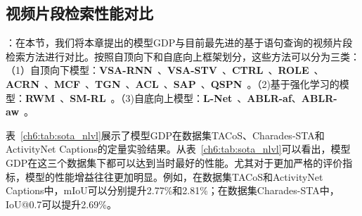 \begin{table}[tbp]
    \centering
    \caption{不同基于视频查询的视频片段检索方法的性能对比}
    \label{ch6:tab:sota_vrl}
\end{table}


\subsection{视频片段检索性能对比}

\textbf{}：在本节，我们将本章提出的模型GDP与目前最先进的基于语句查询的视频片段检索方法进行对比。按照自顶向下和自底向上框架划分，这些方法可以分为三类：（1）自顶向下模型：\textbf{VSA-RNN}~\cite{gao2017tall}、\textbf{VSA-STV}~\cite{gao2017tall}、\textbf{CTRL}~\cite{gao2017tall}、\textbf{ROLE}~\cite{liu2018cross}、\textbf{ACRN}~\cite{liu2018attentive}、\textbf{MCF}~\cite{wu2018multi}、\textbf{TGN}~\cite{chen2018temporally}、\textbf{ACL}~\cite{ge2019mac}、\textbf{SAP}~\cite{chen2019semantic}、\textbf{QSPN}~\cite{xu2019multilevel}。（2)基于强化学习的模型：\textbf{RWM}~\cite{he2019read}、\textbf{SM-RL}~\cite{wang2019language}。（3)自底向上模型：\textbf{L-Net}~\cite{chen2019localizing}、\textbf{ABLR-af}、\textbf{ABLR-aw}~\cite{yuan2019find}。

表~\ref{ch6:tab:sota_nlvl}展示了模型GDP在数据集TACoS、Charades-STA和ActivityNet Captions的定量实验结果。从表~\ref{ch6:tab:sota_nlvl}可以看出，模型GDP在这三个数据集下都可以达到当时最好的性能。尤其对于更加严格的评价指标，模型的性能增益往往更加明显。例如，在数据集TACoS和ActivityNet Captions中，mIoU可以分别提升2.77\%和2.81\%；在数据集Charades-STA中，IoU@0.7可以提升2.69\%。

